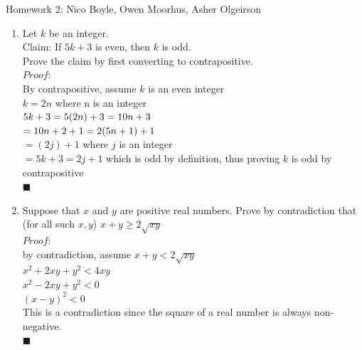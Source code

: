 \documentclass[12pt]{article}
\begin{document}
  
\pagestyle{empty}
 




\vskip0.5in




Homework 2: Nico Boyle, Owen Moorhus, Asher Olgeirson
\begin{enumerate}


\item Let $k$ be an integer. \\
Claim: If $5k+3$ is even, then $k$ is odd. \\
Prove the claim by first converting to contrapositive. \\   %

{\color{blue}
$Proof:$\\
By contrapositive, assume $k$ is an even integer\\
$k=2n$ where n is an integer\\
$5k+3=5(2n)+3\\
=10n+3$\\
$=10n+2+1\\
=2(5n+1)+1$\\
$=(2j)+1$ where $j$ is an integer\\
$=5k+3=2j+1$ which is odd by definition, thus proving $k$ is odd by contrapositive\\
$\blacksquare$
}

\newpage


\item  Suppose that $x$ and $y$ are positive real numbers.
Prove by contradiction that (for all such $x,y$) $x+y \geqslant 2\sqrt{xy}$\\

{\color{blue}
$Proof:$\\
by contradiction, assume $x+y< 2\sqrt{xy}$\\
$x^{2}+2xy+y^{2}<4xy$\\
$x^{2}-2xy+y^{2}<0$\\
$(x-y)^{2}<0$\\
This is a contradiction since the square of a real number is always non-negative.\\
$\blacksquare$
}
\newpage


\end{enumerate}
\end{document}
